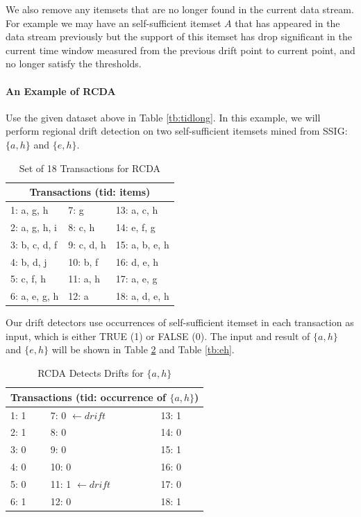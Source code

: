 We also remove any itemsets that are no longer found in the current data stream. For example we may have an self-sufficient itemset $A$ that has appeared in the data stream previously but the support of this itemset has drop significant in the current time window measured from the previous drift point to current point, and no longer satisfy the thresholds.  

\paragraph{An Example of RCDA}

Use the given dataset above in Table \ref{tb:tidlong}. In this example, we will perform regional drift detection on two self-sufficient itemsets mined from SSIG: $\{a, h\}$ and $\{e, h\}$.

\begin{table}[H]
\caption{Set of 18 Transactions for RCDA}
\label{tb:tidlong1}
\centering
 \begin{tabular}{p{4cm} p{4cm} p{4cm}} 
 \hline\hline
 \multicolumn{3}{c}{Transactions (tid: items)}\\
 \hline
 1: a, g, h & 7: g & 13: a, c, h\\ 
 2: a, g, h, i & 8: c, h & 14: e, f, g\\
 3: b, c, d, f & 9: c, d, h & 15: a, b, e, h\\
 4: b, d, j & 10: b, f & 16: d, e, h\\
 5: c, f, h & 11: a, h & 17: a, e, g\\
 6: a, e, g, h & 12: a & 18: a, d, e, h\\
 \hline
\end{tabular}
\end{table}

Our drift detectors use occurrences of self-sufficient itemset in each transaction as input, which is either TRUE (1) or FALSE (0). The input and result of $\{a, h\}$ and $\{e, h\}$ will be shown in Table \ref{tb:ah} and Table \ref{tb:eh}.

\begin{table}[H]
\caption{RCDA Detects Drifts for $\{a, h\}$}
\label{tb:ah}
\centering
 \begin{tabular}{p{4cm} p{4cm} p{4cm}} 
 \hline\hline
 \multicolumn{3}{c}{Transactions (tid: occurrence of $\{a, h\}$)}\\
 \hline
 1: 1 & 7: 0 $\leftarrow drift$ & 13: 1\\ 
 2: 1 & 8: 0 & 14: 0\\
 3: 0 & 9: 0 & 15: 1\\
 4: 0 & 10: 0 & 16: 0\\
 5: 0 & 11: 1 $\leftarrow drift$ & 17: 0\\
 6: 1 & 12: 0 & 18: 1\\
 \hline
\end{tabular}
\end{table}


